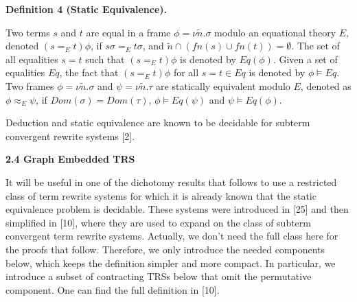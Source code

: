 \documentclass[10pt,a4paper]{amsart}
\begin{document}
 
 
\par\medskip\noindent\textbf{Definition 4 (Static Equivalence).}\par
 
 
Two terms $s$ and $t$ are equal in a frame $\phi=\nu\tilde{n}.\sigma$ modulo an equational theory $E$, denoted $(s=_{E}t)\phi$, if $s\sigma=_{E}t\sigma$, and ${\tilde{n}}\cap(\mathit{fn}(s)\cup\mathit{fn}(t))=\emptyset$. The set of all equalities $s=t$ such that $(s=_{E}t)\phi$ is denoted by $Eq(\phi)$. Given a set of equalities $Eq$, the fact that $(s=_{E}t)\phi$ for all $s=t\in Eq$ is denoted by $\phi\models Eq$. Two frames $\phi=\nu\tilde{n}.\sigma$ and $\psi=\nu\tilde{n}.\tau$ are statically equivalent modulo $E$, denoted as $\phi\approx_{E}\psi$, if $Dom(\sigma)=Dom(\tau)$, $\phi\models Eq(\psi)$ and $\psi\models Eq(\phi)$.\par
 
 
 
 
Deduction and static equivalence are known to be decidable for subterm convergent rewrite systems [2].\par
 
 
 
 
\par\medskip\noindent\textbf{2.4 Graph Embedded TRS}\par
 
 
It will be useful in one of the dichotomy results that follows to use a restricted class of term rewrite systems for which it is already known that the static equivalence problem is decidable. These systems were introduced in [25] and then simplified in [10], where they are used to expand on the class of subterm convergent term rewrite systems. Actually, we don’t need the full class here for the proofs that follow. Therefore, we only introduce the needed components below, which keeps the definition simpler and more compact. In particular, we introduce a subset of contracting TRSs below that omit the permutative component. One can find the full definition in [10].\par
 
\end{document}
